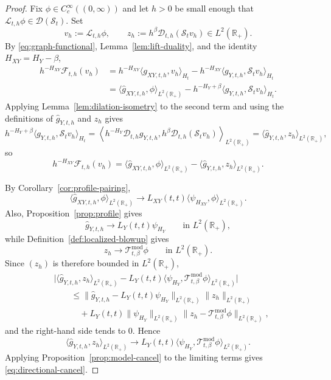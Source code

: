 \documentclass[11pt,a4paper]{amsart}
\theoremstyle{plain}
\theoremstyle{definition}
\theoremstyle{remark}
\newcommand{\R}{\mathbb{R}}
\begin{document}
\begin{proof}
Fix $\phi\in C_c^\infty((0,\infty))$ and let $h>0$ be small enough that
$\mathcal L_{t,h}\phi\in\mathcal D(\mathcal S_t)$. Set
\[
v_h:=\mathcal L_{t,h}\phi,
\qquad
z_h:=h^{\beta}\mathcal D_{t,h}(\mathcal S_t v_h)\in L^2(\R_+).
\]
By \eqref{eq:graph-functional}, Lemma~\ref{lem:lift-duality}, and the identity
$H_{XY}=H_Y-\beta$,
\begin{align*}
h^{-H_{XY}}\mathcal F_{t,h}(v_h)
&=
h^{-H_{XY}}\langle g_{XY,t,h},v_h\rangle_{H_t}
-h^{-H_{XY}}\langle g_{Y,t,h},\mathcal S_t v_h\rangle_{H_t} \\
&=
\langle \widehat g_{XY,t,h},\phi\rangle_{L^2(\R_+)}
-h^{-H_Y+\beta}\langle g_{Y,t,h},\mathcal S_t v_h\rangle_{H_t}.
\end{align*}
Applying Lemma~\ref{lem:dilation-isometry} to the second term and using the definitions of
$\widehat g_{Y,t,h}$ and $z_h$ gives
\[
h^{-H_Y+\beta}\langle g_{Y,t,h},\mathcal S_t v_h\rangle_{H_t}
=
\left\langle
h^{-H_Y}\mathcal D_{t,h}g_{Y,t,h},
h^\beta \mathcal D_{t,h}(\mathcal S_t v_h)
\right\rangle_{L^2(\R_+)}
=
\langle \widehat g_{Y,t,h},z_h\rangle_{L^2(\R_+)},
\]
so
\[
h^{-H_{XY}}\mathcal F_{t,h}(v_h)
=
\langle \widehat g_{XY,t,h},\phi\rangle_{L^2(\R_+)}
-\langle \widehat g_{Y,t,h},z_h\rangle_{L^2(\R_+)}.
\]

By Corollary~\ref{cor:profile-pairing},
\[
\langle \widehat g_{XY,t,h},\phi\rangle_{L^2(\R_+)}
\longrightarrow
L_{XY}(t,t)\langle \psi_{H_{XY}},\phi\rangle_{L^2(\R_+)}.
\]
Also, Proposition~\ref{prop:profile} gives
\[
\widehat g_{Y,t,h}\to L_Y(t,t)\psi_{H_Y}
\qquad\text{in }L^2(\R_+),
\]
while Definition~\ref{def:localized-blowup} gives
\[
z_h\to \mathcal T_{t,\beta}^{\mathrm{mod}}\phi
\qquad\text{in }L^2(\R_+).
\]
Since $(z_h)$ is therefore bounded in $L^2(\R_+)$,
\begin{align*}
&\bigl|
\langle \widehat g_{Y,t,h},z_h\rangle_{L^2(\R_+)}
-L_Y(t,t)
\langle \psi_{H_Y},\mathcal T_{t,\beta}^{\mathrm{mod}}\phi\rangle_{L^2(\R_+)}
\bigr| \\
&\qquad\le
\|\widehat g_{Y,t,h}-L_Y(t,t)\psi_{H_Y}\|_{L^2(\R_+)}\|z_h\|_{L^2(\R_+)} \\
&\qquad\quad+
L_Y(t,t)\|\psi_{H_Y}\|_{L^2(\R_+)}
\|z_h-\mathcal T_{t,\beta}^{\mathrm{mod}}\phi\|_{L^2(\R_+)},
\end{align*}
and the right-hand side tends to $0$. Hence
\[
\langle \widehat g_{Y,t,h},z_h\rangle_{L^2(\R_+)}
\longrightarrow
L_Y(t,t)
\langle \psi_{H_Y},\mathcal T_{t,\beta}^{\mathrm{mod}}\phi\rangle_{L^2(\R_+)}.
\]
Applying Proposition~\ref{prop:model-cancel} to the limiting terms gives
\eqref{eq:directional-cancel}.
\end{proof}
\end{document}
